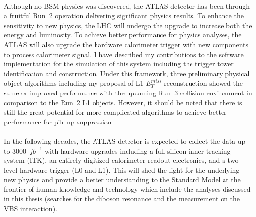 \\Although no BSM physics was discovered, the ATLAS detector has been through a fruitful Run~2 operation delivering significant physics results. To enhance the sensitivity to new physics, the LHC will undergo the upgrade to increase both the energy and luminosity. To achieve better performance for physics analyses, the ATLAS will also upgrade the hardware calorimeter trigger with new components to process calorimeter signal. I have described my contributions to the software implementation for the simulation of this system including the trigger tower identification and construction. Under this framework, three preliminary physical object algorithms including my proposal of L1 $E^{miss}_{T}$ reconstruction showed the same or improved performance with the upcoming Run~3 collision environment in comparison to the Run~2 L1 objects. However, it should be noted that there is still the great potential for more complicated algorithms to achieve better performance for pile-up suppression. 
\\
\\In the following decades, the ATLAS detector is expected to collect the data up to 3000~$fb^{-1}$ with hardware upgrades including a full silicon inner tracking system (ITK), an entirely digitized calorimeter readout electronics, and a two-level hardware trigger (L0 and L1). This will shed the light for the underlying new physics and provide a better understanding to the Standard Model at the frontier of human knowledge and technology which include the analyses discussed in this thesis (searches for the diboson resonance and the measurement on the VBS interaction).
\newpage
{}